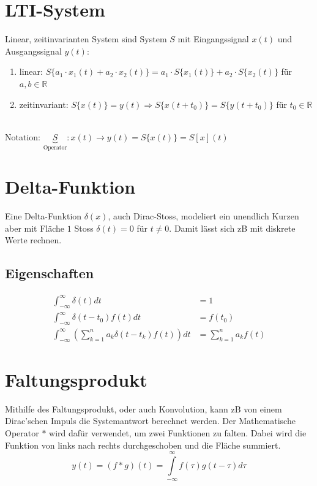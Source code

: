 \section{LTI-System}
Linear, zeitinvarianten System sind System $S$ mit Eingangssignal $x(t)$ und Ausgangssignal $y(t)$:
\begin{enumerate}[nosep]
	\item linear: $S\{a_1 \cdot x_1(t) + a_2 \cdot x_2(t)\} = a_1 \cdot S\{x_1(t)\} + a_2 \cdot S\{x_2(t)\}$ für $a,b \in \mathbb{R}$
	\item zeitinvariant: $S\{x(t)\} = y(t) \Rightarrow  S\{x(t + t_0)\} = S\{y(t + t_0)\}$ für $t_0 \in \mathbb{R}$
\end{enumerate}
~\\
Notation: $\underbrace{S}_\text{Operator}: x(t) \rightarrow y(t) = S\{x(t)\} = S[x](t)$

\section{Delta-Funktion}
Eine Delta-Funktion $\delta(x)$, auch Dirac-Stoss, modeliert ein unendlich Kurzen aber mit Fläche $1$ Stoss $\delta(t) = 0$ für $t \neq 0$. Damit lässt sich zB mit diskrete Werte rechnen.

\subsection{Eigenschaften}
\begin{align*}
	\int_{-\infty}^{\infty}\delta(t)dt &= 1 \\
	\int_{-\infty}^{\infty}\delta(t - t_0)f(t)dt &= f(t_0) \\
	\int_{-\infty}^{\infty}\left(\sum_{k=1}^{n}a_k\delta(t - t_k)f(t)\right)dt &= \sum_{k=1}^{n}a_kf(t)
\end{align*}

\section{Faltungsprodukt}
Mithilfe des Faltungsprodukt, oder auch Konvolution, kann zB von einem Dirac'schen Impuls die Systemantwort berechnet werden. Der Mathematische Operator $*$ wird dafür verwendet, um zwei Funktionen zu falten. Dabei wird die Funktion von links nach rechts durchgeschoben und die Fläche summiert.
\[
y(t) = (f * g)(t) = \int\limits_{-\infty}^{\infty}f(\tau)g(t - \tau)d\tau
\]

